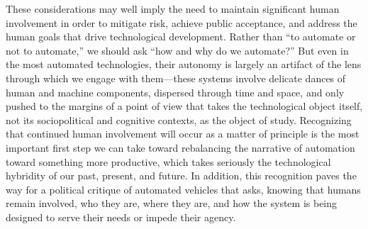 These considerations may well imply the need to maintain significant
human involvement in order to mitigate risk, achieve public
acceptance, and address the human goals that drive technological
development. Rather than ``to automate or not to automate,'' we should ask
``how and why do we automate?'' But even in the most automated
technologies, their 
autonomy is largely an artifact of the lens through which we engage
with them---these systems involve delicate dances of human and machine
components, dispersed through time and space, and only pushed to the
margins of a point of view that takes the technological object itself,
not its sociopolitical and cognitive contexts, as the object of study.
Recognizing that continued human involvement will occur as a matter of
principle is 
the most important first step we can take toward rebalancing the
narrative of automation toward something more productive, which takes
seriously the technological hybridity of our past, present, and future.
In addition, this recognition paves the way for a political critique
of automated vehicles 
that asks, knowing 
that humans remain involved, who they are, where they are, and how
the system is being designed to serve their needs or impede their
agency.

